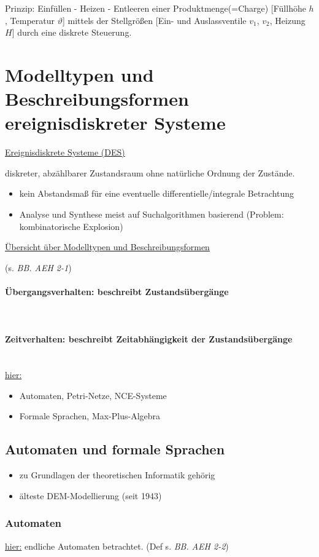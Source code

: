 \documentclass[12pt,a4paper]{scrartcl}
\numberwithin{equation}{section}
\newcommand{\properparagraph}[1]{\paragraph{#1}\mbox{}\\}
\begin{document}
Prinzip: Einfüllen - Heizen - Entleeren einer Produktmenge(=Charge) [Füllhöhe $h$, Temperatur $\vartheta$] mittels der Stellgrößen [Ein- und Auslassventile $v_1$, $v_2$, Heizung $H$] durch eine diskrete Steuerung.


\section{Modelltypen und Beschreibungsformen ereignisdiskreter Systeme}

\underline{Ereignisdiskrete Systeme (DES)}

diskreter, abzählbarer Zustandsraum ohne natürliche Ordnung der Zustände.
\begin{itemize}
	\item kein Abstandsmaß für eine eventuelle differentielle/integrale Betrachtung
	\item Analyse und Synthese meist auf Suchalgorithmen basierend (Problem: kombinatorische Explosion)
\end{itemize}

\underline{Übersicht über Modelltypen und Beschreibungsformen}

(s. \textit{BB. AEH 2-1})

\properparagraph{Übergangsverhalten: beschreibt Zustandsübergänge}

\properparagraph{Zeitverhalten: beschreibt Zeitabhängigkeit der Zustandsübergänge}

\underline{hier:}

\begin{itemize}
	\item Automaten, Petri-Netze, NCE-Systeme
	\item Formale Sprachen, Max-Plus-Algebra
\end{itemize}

\subsection{Automaten und formale Sprachen}
\begin{itemize}
	\item zu Grundlagen der theoretischen Informatik gehörig
	\item älteste DEM-Modellierung (seit 1943)
\end{itemize}

\subsubsection{Automaten}
\underline{hier:} endliche Automaten betrachtet. (Def s. \textit{BB. AEH 2-2})
\end{document}
